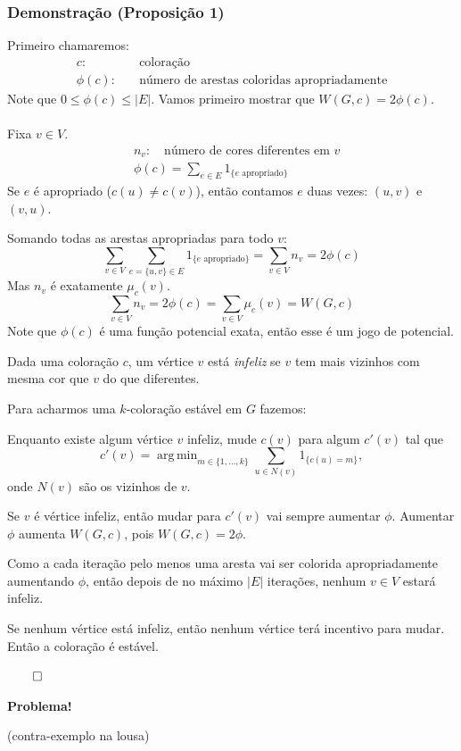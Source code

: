 \documentclass{beamer}
\DeclareMathOperator*{\argmin}{arg\,min}
\theoremstyle{plain}
\begin{document}
\begin{frame}
  \frametitle{Demonstração (Proposição 1)}
  Primeiro chamaremos:
  \begin{align*}
    c:\quad &\text{coloração}\\
    \phi(c):\quad &\text{número de arestas coloridas apropriadamente}
  \end{align*}
  Note que $0\leq \phi(c)\leq |E|$. Vamos primeiro mostrar que $W(G,c)=2\phi(c)$.\\~\\
  Fixa $v\in V$.
  \begin{align*}
    &n_v:\quad \text{número de cores diferentes em $v$}\\
    &\phi(c)=\sum_{e\in E}1_{\{e\text{ apropriado}\}}
  \end{align*}
  Se $e$ é apropriado ($c(u)\neq c(v)$), então contamos $e$ duas vezes: $(u,v)$ e $(v,u)$.
\end{frame}

\begin{frame}
  Somando todas as arestas apropriadas para todo $v$:
  \begin{equation*}
    \sum_{v\in V}\sum_{e=\{u,v\}\in E}1_{\{e\text{ apropriado}\}}=\sum_{v\in V}n_v=2\phi(c)
  \end{equation*}
  Mas $n_v$ é exatamente $\mu_c(v)$.
  \begin{equation*}
    \sum_{v\in V}n_v=2\phi(c)=\sum_{v\in V}\mu_c(v)=W(G,c)
  \end{equation*}
  Note que $\phi(c)$ é uma função potencial exata, então esse é um jogo de potencial.
\end{frame}

\begin{frame}
  Dada uma coloração $c$, um vértice $v$ está \textit{infeliz} se $v$ tem mais vizinhos com mesma
  cor que $v$ do que diferentes.

  Para acharmos uma $k$-coloração estável em $G$ fazemos:

  Enquanto existe algum vértice $v$ infeliz, mude $c(v)$ para algum $c'(v)$ tal que
  \begin{equation*}
    c'(v)=\argmin_{m\in\{1,\ldots,k\}}\sum_{u\in N(v)}1_{\{c(u)=m\}},
  \end{equation*}
  onde $N(v)$ são os vizinhos de $v$.
\end{frame}

\begin{frame}
  Se $v$ é vértice infeliz, então mudar para $c'(v)$ vai sempre aumentar $\phi$. Aumentar $\phi$
  aumenta $W(G,c)$, pois $W(G,c)=2\phi$.

  Como a cada iteração pelo menos uma aresta vai ser colorida apropriadamente aumentando $\phi$,
  então depois de no máximo $|E|$ iterações, nenhum $v\in V$ estará infeliz.

  Se nenhum vértice está infeliz, então nenhum vértice terá incentivo para mudar. Então a coloração
  é estável.

  \hfill$\qed$

  {\color{red}\textbf{Problema!}}

  {\color{gray} (contra-exemplo na lousa)}
\end{frame}
\end{document}
